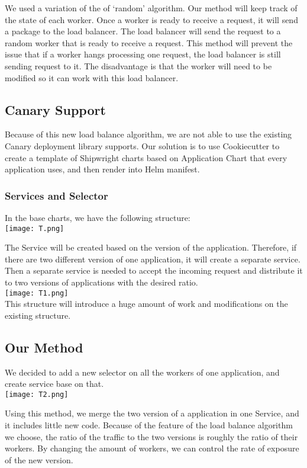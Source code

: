 \documentclass{article}
\begin{document}
We used a variation of the of `random' algorithm. Our method will keep track of the state of each worker. Once a worker is ready to receive a request, it will send a package to the load balancer. The load balancer will send the request to a random worker that is ready to receive a request. This method will prevent the issue that if a worker hangs processing one request, the load balancer is still sending request to it. The disadvantage is that the worker will need to be modified so it can work with this load balancer.

\subsection{Canary Support}
Because of this new load balance algorithm, we are not able to use the existing Canary deployment library supports. Our solution is to use Cookiecutter to create a template of Shipwright charts based on Application Chart that every application uses, and then render into Helm manifest. 

\subsubsection{Services and Selector}
In the base charts, we have the following structure: \\
\texttt{[image: T.png]}

The Service will be created based on the version of the application. Therefore, if there are two different version of one application, it will create a separate service. Then a separate service is needed to accept the incoming request and distribute it to two versions of applications with the desired ratio.  
\\
\texttt{[image: T1.png]}
\\
This structure will introduce a huge amount of work and modifications on the existing structure. 

\subsection{Our Method}
We decided to add a new selector on all the workers of one application, and create service base on that. \\

\texttt{[image: T2.png]}

Using this method, we merge the two version of a application in one Service, and it includes little new code. Because of the feature of the load balance algorithm we choose, the ratio of the traffic to the two versions is roughly the ratio of their workers. By changing the amount of workers, we can control the rate of exposure of the new version. 
\end{document}
